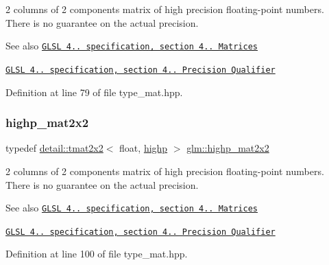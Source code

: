 2 columns of 2 components matrix of high precision floating-\/point numbers. There is no guarantee on the actual precision.

\begin{DoxySeeAlso}{See also}
\href{http://www.opengl.org/registry/doc/GLSLangSpec.4.20.8.pdf}{\tt G\+L\+SL 4.. specification, section 4.. Matrices} 

\href{http://www.opengl.org/registry/doc/GLSLangSpec.4.20.8.pdf}{\tt G\+L\+SL 4.. specification, section 4.. Precision Qualifier} 
\end{DoxySeeAlso}


Definition at line 79 of file type\+\_\+mat.\+hpp.

\mbox{\label{group__core__precision_ga694146b8d430b22caa8b37571d9bc8bc}} 
\subsubsection{\texorpdfstring{highp\+\_\+mat2x2}{highp\_mat2x2}}
{\footnotesize\ttfamily typedef \hyperlink{structglm_1_1detail_1_1tmat2x2}{detail\+::tmat2x2}$<$ float, \hyperlink{namespaceglm_a0f04f086094c747d227af4425893f545ac6f7eab42eacbb10d59a58e95e362074}{highp} $>$ \hyperlink{group__core__precision_ga694146b8d430b22caa8b37571d9bc8bc}{glm\+::highp\+\_\+mat2x2}}

2 columns of 2 components matrix of high precision floating-\/point numbers. There is no guarantee on the actual precision.

\begin{DoxySeeAlso}{See also}
\href{http://www.opengl.org/registry/doc/GLSLangSpec.4.20.8.pdf}{\tt G\+L\+SL 4.. specification, section 4.. Matrices} 

\href{http://www.opengl.org/registry/doc/GLSLangSpec.4.20.8.pdf}{\tt G\+L\+SL 4.. specification, section 4.. Precision Qualifier} 
\end{DoxySeeAlso}


Definition at line 100 of file type\+\_\+mat.\+hpp.

\mbox{\label{group__core__precision_ga7d4e5a1c803be5688c75241c924dfa58}} 
